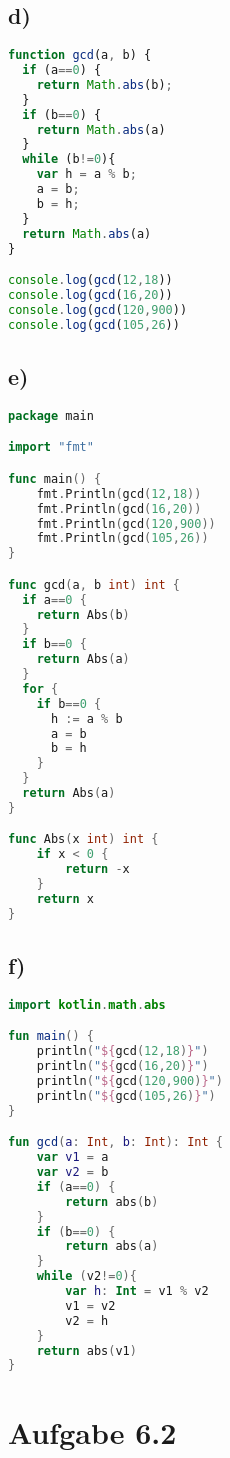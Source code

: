 \documentclass[a4paper,11pt]{scrartcl}
\begin{document}
    \subsection*{d)}
        \begin{lstlisting}[language=JavaScript]
function gcd(a, b) {
  if (a==0) {
    return Math.abs(b);
  }
  if (b==0) {
    return Math.abs(a)
  }
  while (b!=0){
    var h = a % b;
    a = b;
    b = h;
  }
  return Math.abs(a)
}

console.log(gcd(12,18))
console.log(gcd(16,20))
console.log(gcd(120,900))
console.log(gcd(105,26))
        \end{lstlisting}

    \newpage
    \subsection*{e)}
        \begin{lstlisting}[language=Go]
package main

import "fmt"

func main() {
	fmt.Println(gcd(12,18))
	fmt.Println(gcd(16,20))
	fmt.Println(gcd(120,900))
	fmt.Println(gcd(105,26))
}

func gcd(a, b int) int {
  if a==0 {
    return Abs(b)
  }
  if b==0 {
    return Abs(a)
  }
  for {
    if b==0 {
      h := a % b
      a = b
      b = h
    }
  }
  return Abs(a)
}

func Abs(x int) int {
	if x < 0 {
		return -x
	}
	return x
}
        \end{lstlisting}
        
    \subsection*{f)}
        \begin{lstlisting}[language=Kotlin]
import kotlin.math.abs 

fun main() {
    println("${gcd(12,18)}")
    println("${gcd(16,20)}")
    println("${gcd(120,900)}")
    println("${gcd(105,26)}")
}

fun gcd(a: Int, b: Int): Int {
    var v1 = a
    var v2 = b
    if (a==0) {
        return abs(b)
    }
    if (b==0) {
        return abs(a)
    }
    while (v2!=0){
        var h: Int = v1 % v2
        v1 = v2
        v2 = h
    }
    return abs(v1)
}
        \end{lstlisting}
        
    \section*{Aufgabe 6.2}
\end{document}
